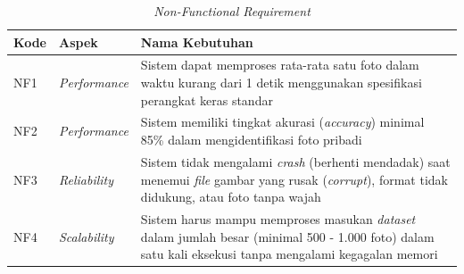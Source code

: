 \begin{table}[tb]
	\caption{\textit{Non-Functional Requirement}}
\label{tab:kebutuhan nonfungsional}
\begin{tabular}{ | p{2cm} | p{3cm} | p{7cm} |}
	\hline
	\textbf{Kode} & \textbf{Aspek} & \textbf{Nama Kebutuhan} \\ \hline
	NF1 & \textit{Performance} & Sistem dapat memproses rata-rata satu foto dalam waktu kurang dari 1 detik menggunakan spesifikasi perangkat keras standar \\ \hline
	NF2	& \textit{Performance} & Sistem memiliki tingkat akurasi (\textit{accuracy}) minimal 85\% dalam mengidentifikasi foto pribadi \\ \hline
	NF3	& \textit{Reliability} & Sistem tidak mengalami \textit{crash} (berhenti mendadak) saat menemui \textit{file} gambar yang rusak (\textit{corrupt}), format tidak didukung, atau foto tanpa wajah \\ \hline
	NF4	& \textit{Scalability} & Sistem harus mampu memproses masukan \textit{dataset} dalam jumlah besar (minimal 500 - 1.000 foto) dalam satu kali eksekusi tanpa mengalami kegagalan memori \\ \hline
	\end{tabular}
\end{table}